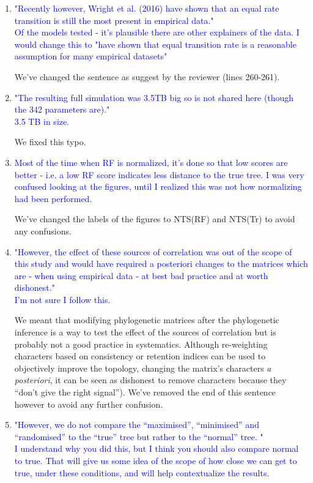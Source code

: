 \documentclass[12pt,letterpaper]{article}
\begin{document}
\begin{enumerate}

\item{\textcolor{blue}{"Recently however, Wright et al. (2016) have shown that an equal rate transition is still the most present in empirical data."\\
Of the models tested - it's plausible there are other explainers of the data. I would change this to "have shown that equal transition rate is a reasonable assumption for many empirical datasets"}}

We've changed the sentence as suggest by the reviewer (lines 260-261).

\item{\textcolor{blue}{"The resulting full simulation was 3.5TB big so is not shared here (though the 342 parameters are)."\\
3.5 TB in size.}}

We fixed this typo.

\item{\textcolor{blue}{Most of the time when RF is normalized, it's done so that low scores are better - i.e. a low RF score indicates less distance to the true tree. I was very confused looking at the figures, until I realized this was not how normalizing had been performed. }}

We've changed the labels of the figures to NTS(RF) and NTS(Tr) to avoid any confusions.

\item{\textcolor{blue}{"However, the effect of these sources of correlation was out of the scope of this study and would have required a posteriori changes to the matrices which are - when using empirical data - at best bad practice and at worth dishonest."\\
I'm not sure I follow this.}}
\label{dishonest}

We meant that modifying phylogenetic matrices after the phylogenetic inference is a way to test the effect of the sources of correlation but is probably not a good practice in systematics.
Although re-weighting characters based on consistency or retention indices can be used to objectively improve the topology, changing the matrix's characters \textit{a posteriori}, it can be seen as dishonest to remove characters because they ``don't give the right signal''). We've removed the end of this sentence however to avoid any further confusion.

\item{\textcolor{blue}{"However, we do not compare the ``maximised'', ``minimised'' and ``randomised'' to the ``true'' tree but rather to the ``normal'' tree. "\\
I understand why you did this, but I think you should also compare normal to true. That will give us some idea of the scope of how close we can get to true, under these conditions, and will help contextualize the results.}}


\end{enumerate}
\end{document}
